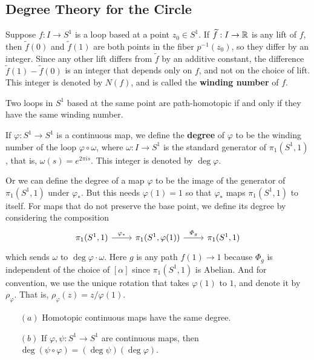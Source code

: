 \subsection{Degree Theory for the Circle}
Suppose $f:I\to S^1$ is a loop based at a point $z_0\in S^1$. If $\widetilde{f}:I\to\mathbb{R}$ is any lift of $f$, then $\widetilde{f}(0)$ and $\widetilde{f}(1)$ are both points in the fiber $p^{-1}(z_0)$, so they differ by an integer. Since any other lift differs from $\widetilde{f}$ by an additive constant, the difference $\widetilde{f}(1)-\widetilde{f}(0)$ is an integer that depends only on $f$, and not on the choice of lift. This integer is denoted by $N(f)$, and is called the \textbf{winding number} of $f$.
\begin{theorem}
Two loops in $S^1$ based at the same point are path-homotopic if and only if they have the same winding number.
\end{theorem}
If $\varphi:S^1\to S^1$ is a continuous map, we define the \textbf{degree} of $\varphi$ to be the winding number of the loop $\varphi\circ\omega$, where $\omega:I\to S^1$ is the standard generator of $\pi_1(S^1,1)$, that is, $\omega(s)=e^{2\pi is}$. This integer is denoted by $\deg\varphi$.\par
Or we can define the degree of a map $\varphi$ to be the image of the generator of $\pi_1(S^1,1)$ under $\varphi_*$. But this needs $\varphi(1)=1$ so that $\varphi_*$ maps $\pi_1(S^1,1)$ to itself. For maps that do not
preserve the base point, we define its degree by considering the composition
\[\begin{tikzcd}
\pi_1(S^1,1)\ar[r,"\varphi_*"]&\pi_1(S^1,\varphi(1))\ar[r,"\varPhi_{g}"]&\pi_1(S^1,1)
\end{tikzcd}\]
which sends $\omega$ to $\deg\varphi\cdot\omega$. Here $g$ is any path $f(1)\to 1$ because $\varPhi_{g}$ is independent of the choice of $[\alpha]$ since $\pi_1(S^1,1)$ is Abelian. And for convention, we use the unique rotation that takes $\varphi(1)$ to $1$, and denote it by $\rho_\varphi$. That is, $\rho_\varphi(z)=z/\varphi(1)$.
\begin{proposition}\label{degree prop}
\mbox{}
\begin{itemize}
\item[$(a)$] Homotopic continuous maps have the same degree.
\item[$(b)$] If $\varphi,\psi:S^1\to S^1$ are continuous maps, then $\deg(\psi\circ\varphi)=(\deg\psi)(\deg\varphi)$.
\end{itemize}
\end{proposition}
